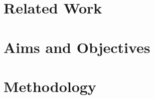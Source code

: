 \documentclass[
11pt, %
oneside, %
english, %
onehalfspacing,%
headsepline, %
]{MastersDoctoralThesis} %
\begin{document}
\chapter*{Related Work}

\chapter*{Aims and Objectives}

\chapter*{Methodology}


\printbibliography\
\end{document}
